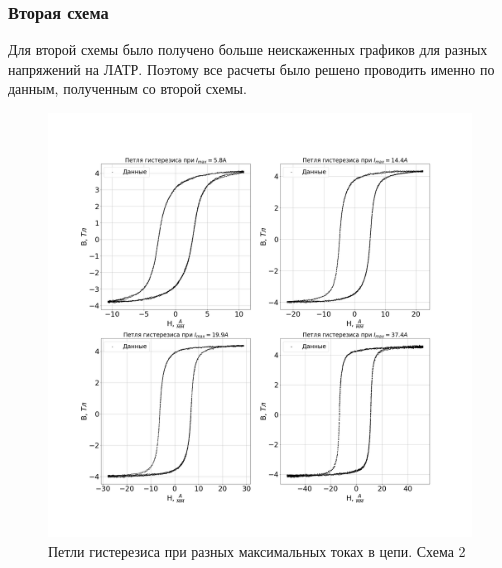 \documentclass[a4paper,14pt]{extarticle}
\begin{document}
	\subsubsection{Вторая схема}
	Для второй схемы было получено больше неискаженных графиков для разных напряжений на ЛАТР. Поэтому все расчеты было решено проводить именно по данным, полученным со второй схемы.
	\begin{figure}[h]
		\centering
		\includegraphics[width=1.0\linewidth]{Lab2_3.png}
		\caption{Петли гистерезиса при разных максимальных токах в цепи. Схема 2}
		\label{fig6}
	\end{figure}
	\newpage
\end{document}
